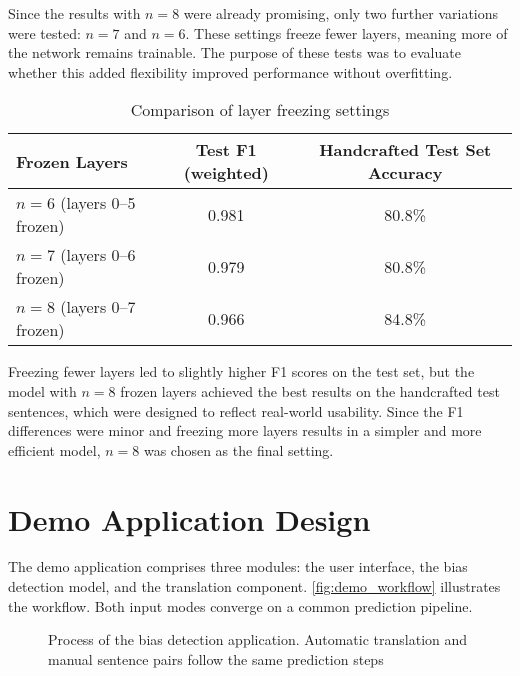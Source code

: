     Since the results with $n=8$ were already promising, only two further variations were tested: $n=7$ and $n=6$. These settings freeze fewer layers, meaning more of the network remains trainable. The purpose of these tests was to evaluate whether this added flexibility improved performance without overfitting.

    \vspace{0.8em}
    \begin{table}[ht]
        \centering
        \begin{tabularx}{\linewidth}{Xcc}
        \toprule
        \textbf{Frozen Layers} & \textbf{Test F1 (weighted)} & \textbf{Handcrafted Test Set Accuracy} \\
        \midrule
        $n=6$ (layers 0--5 frozen) & 0.981 & 80.8\% \\
        $n=7$ (layers 0--6 frozen) & 0.979 & 80.8\% \\
        $n=8$ (layers 0--7 frozen) & 0.966 & 84.8\% \\
        \bottomrule
        \end{tabularx}
        \caption{Comparison of layer freezing settings}
    \end{table}

    Freezing fewer layers led to slightly higher F1 scores on the test set, but the model with $n=8$ frozen layers achieved the best results on the handcrafted test sentences, which were designed to reflect real-world usability. Since the F1 differences were minor and freezing more layers results in a simpler and more efficient model, $n=8$ was chosen as the final setting.

\section{Demo Application Design}
    The demo application comprises three modules: the user interface, the bias detection model, and the translation component. \autoref{fig:demo_workflow} illustrates the workflow. Both input modes converge on a common prediction pipeline.

\begin{figure}[htb]
    \centering
    \scalebox{0.8}{}
    \caption[Process of the bias detection application]{Process of the bias detection application. Automatic translation and manual sentence pairs follow the same prediction steps}
    \label{fig:demo_workflow}
\end{figure}

